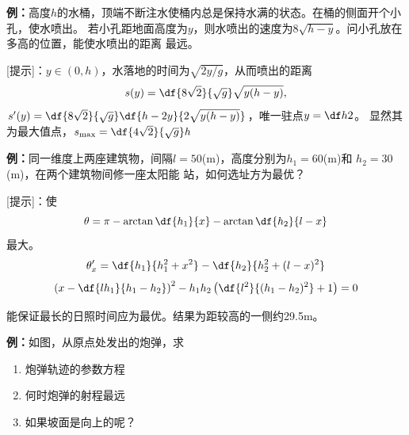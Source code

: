 {\bf 例：}高度$h$的水桶，顶端不断注水使桶内总是保持水满的状态。在桶的侧面开个小孔，使水喷出。
若小孔距地面高度为$y$，则水喷出的速度为$8\sqrt{h-y}$。问小孔放在多高的位置，能使水喷出的距离
最远。

[提示]：$y\in(0,h)$，水落地的时间为$\sqrt{2y/g}$，从而喷出的距离
$$s(y)=\df{8\sqrt{2}}{\sqrt g}\sqrt{y(h-y)},$$
$s'(y)=\df{8\sqrt{2}}{\sqrt g}\df{h-2y}{2\sqrt{y(h-y)}}$，唯一驻点$y=\df h2$。
显然其为最大值点，$s_{\max}=\df{4\sqrt 2}{\sqrt{g}}h$

{\bf 例：}同一维度上两座建筑物，间隔$l=50$(m)，高度分别为$h_1=60$(m)和
$h_2=30$(m)，在两个建筑物间修一座太阳能
站，如何选址方为最优？

[提示]：使
$$\theta=\pi-\arctan\df{h_1}{x}-\arctan\df{h_2}{l-x}$$
最大。
$$\theta'_x=\df{h_1}{h_1^2+x^2}-\df{h_2}{h_2^2+(l-x)^2}$$
$$\left(x-\df{lh_1}{h_1-h_2}\right)^2-h_1h_2\left(\df{l^2}
{(h_1-h_2)^2}+1\right)=0$$

能保证最长的日照时间应为最优。结果为距较高的一侧约29.5m。

{\bf 例：}如图，从原点处发出的炮弹，求
\begin{enumerate}[(1)]
  \setlength{\itemindent}{1cm}
  \item 炮弹轨迹的参数方程
  \item 何时炮弹的射程最远
  \item 如果坡面是向上的呢？
\end{enumerate}
\begin{center}
\end{center}

